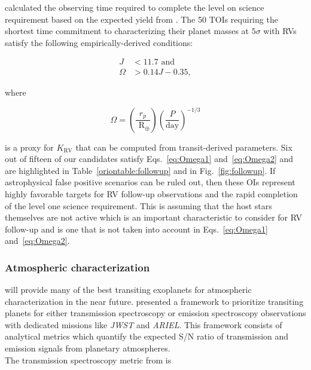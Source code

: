 \cite{cloutier18b} calculated the observing time required to complete the \tess{} level on science requirement
based on the expected \tess{} yield from \cite{sullivan15}. The 50 TOIs requiring the shortest time
commitment to characterizing their planet masses at $5\sigma$ with RVs satisfy the following empirically-derived
conditions: 

\begin{align}
  J &< 11.7 \text{ and} \label{eq:Omega1} \\
  \Omega &> 0.14J - 0.35, \label{eq:Omega2}
\end{align}

\noindent where

\begin{equation}
\Omega = \left( \frac{r_p}{\text{ R}_{\oplus}} \right) \left( \frac{P}{\text{day}}  \right)^{-1/3}
\end{equation}

\noindent is a proxy for $K_{\text{RV}}$ that can be computed from transit-derived parameters.
Six out of fifteen of our candidates satisfy Eqs.~\ref{eq:Omega1} and~\ref{eq:Omega2} and are highlighted
in Table~\ref{oriontable:followup} and in Fig.~\ref{fig:followup}.
If astrophysical false positive scenarios can be ruled out, then these OIs
represent highly favorable targets for RV follow-up observations and the rapid completion of the
\tess{} level one science requirement. This is assuming that the host stars themselves are not active which
is an important characteristic to consider for RV follow-up \citep{moutou17} and is one that is not taken into
account in Eqs.~\ref{eq:Omega1} and~\ref{eq:Omega2}.

\subsubsection{Atmospheric characterization} \label{sect:atmospheres}
\tess{} will provide many of the best transiting exoplanets for atmospheric characterization in the
near future. \cite{kempton18} presented a framework to prioritize transiting planets for
either transmission spectroscopy or emission spectroscopy observations with dedicated missions
like \emph{JWST} and \emph{ARIEL}. This framework consists of analytical metrics which quantify
the expected S/N ratio of transmission and emission signals from planetary atmospheres. \\

The transmission spectroscopy metric from \cite{kempton18} is

